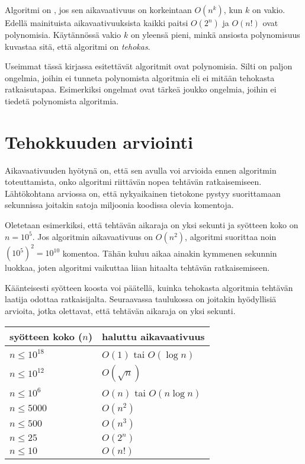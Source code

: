 Algoritmi on ,
jos sen aikavaativuus on korkeintaan $O(n^k)$,
kun $k$ on vakio.
Edellä mainituista aikavaativuuksista
kaikki paitsi $O(2^n)$ ja $O(n!)$
ovat polynomisia.
Käytännössä vakio $k$ on yleensä pieni,
minkä ansiosta
polynomisuus kuvastaa sitä,
että algoritmi on \emph{tehokas}.

Useimmat tässä kirjassa esitettävät algoritmit
ovat polynomisia.
Silti on paljon ongelmia, joihin ei tunneta
polynomista algoritmia eli ei mitään tehokasta
ratkaisutapaa.
Esimerkiksi  ongelmat ovat
tärkeä joukko ongelmia,
joihin ei tiedetä polynomista algoritmia.

\section{Tehokkuuden arviointi}

Aikavaativuuden hyötynä on,
että sen avulla voi arvioida ennen algoritmin
toteuttamista, onko algoritmi riittävän nopea
tehtävän ratkaisemiseen.
Lähtökohtana arviossa on, että nykyaikainen tietokone
pystyy suorittamaan sekunnissa joitakin
satoja miljoonia koodissa olevia komentoja.

Oletetaan esimerkiksi, että tehtävän aikaraja on 
yksi sekunti ja syötteen koko on $n=10^5$.
Jos algoritmin aikavaativuus on $O(n^2)$,
algoritmi suorittaa noin $(10^5)^2=10^{10}$ komentoa.
Tähän kuluu aikaa ainakin kymmenen sekunnin luokkaa,
joten algoritmi vaikuttaa liian hitaalta tehtävän ratkaisemiseen.

Käänteisesti syötteen koosta voi päätellä,
kuinka tehokasta algoritmia tehtävän laatija odottaa
ratkaisijalta.
Seuraavassa taulukossa on joitakin hyödyllisiä arvioita,
jotka olettavat, että tehtävän aikaraja on yksi sekunti.

\begin{center}
\begin{tabular}{ll}
syötteen koko ($n$) & haluttu aikavaativuus \\
\hline
$n \le 10^{18}$ & $O(1)$ tai $O(\log n)$ \\
$n \le 10^{12}$ & $O(\sqrt n)$ \\
$n \le 10^6$ & $O(n)$ tai $O(n \log n)$ \\
$n \le 5000$ & $O(n^2)$ \\
$n \le 500$ & $O(n^3)$ \\
$n \le 25$ & $O(2^n)$ \\
$n \le 10$ & $O(n!)$ \\
\end{tabular}
\end{center}

